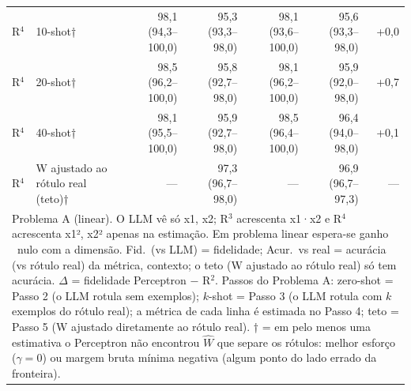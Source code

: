 \begin{table}[htbp]
\begin{tabular}{llrrrrr}
R$^4$ & 10-shot† & 98,1 (94,3–100,0) & 95,3 (93,3–98,0) & 98,1 (93,6–100,0) & 95,6 (93,3–98,0) & +0,0 \\
R$^4$ & 20-shot† & 98,5 (96,2–100,0) & 95,8 (92,7–98,0) & 98,1 (96,2–100,0) & 95,9 (92,0–98,0) & +0,7 \\
R$^4$ & 40-shot† & 98,1 (95,5–100,0) & 95,9 (92,7–98,0) & 98,5 (96,4–100,0) & 96,4 (94,0–98,0) & +0,1 \\
R$^4$ & W ajustado ao rótulo real (teto)† & — & 97,3 (96,7–98,0) & — & 96,9 (96,7–97,3) & — \\
\bottomrule
\multicolumn{7}{p{0.95\linewidth}}{\footnotesize Problema A (linear). O LLM vê só x1, x2; R$^3$ acrescenta x1·x2 e R$^4$ acrescenta x1², x2² apenas na estimação. Em problema linear espera-se ganho ~nulo com a dimensão. Fid.\ (vs LLM) = fidelidade; Acur.\ vs real = acurácia (vs rótulo real) da métrica, contexto; o teto (W ajustado ao rótulo real) só tem acurácia. $\Delta$ = fidelidade Perceptron $-$ R$^2$. Passos do Problema A: zero-shot = Passo 2 (o LLM rotula sem exemplos); $k$-shot = Passo 3 (o LLM rotula com $k$ exemplos do rótulo real); a métrica de cada linha é estimada no Passo 4; teto = Passo 5 (W ajustado diretamente ao rótulo real). † = em pelo menos uma estimativa o Perceptron não encontrou $\hat{W}$ que separe os rótulos: melhor esforço ($\gamma = 0$) ou margem bruta mínima negativa (algum ponto do lado errado da fronteira).} \\
\end{tabular}
\end{table}
